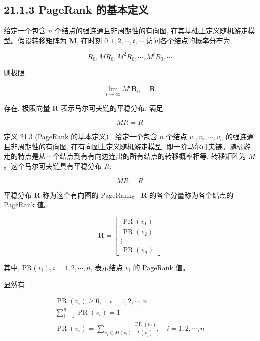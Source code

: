 \documentclass[10pt]{article}
\begin{document}
\begin{CJK*}{UTF8}{bsmi}
\subsection*{21.1.3 PageRank 的基本定义}
给定一个包含 $n$ 个结点的强连通且非周期性的有向图, 在其基础上定义随机游走模型。假设转移矩阵为 $\boldsymbol{M}$, 在时刻 $0,1,2, \cdots, t, \cdots$ 访问各个结点的概率分布为

$$
R_{0}, M R_{0}, M^{2} R_{0}, \cdots, M^{t} R_{0}, \cdots
$$

则极限


\begin{equation*}
\lim _{t \rightarrow \infty} M^{t} \boldsymbol{R}_{0}=\boldsymbol{R} \tag{21.5}
\end{equation*}


存在, 极限向量 $\boldsymbol{R}$ 表示马尔可夫链的平稳分布, 满足

$$
M R=R
$$

定义 21.3 (PageRank 的基本定义） 给定一个包含 $n$ 个结点 $v_{1}, v_{2}, \cdots, v_{n}$ 的强连通且非周期性的有向图, 在有向图上定义随机游走模型, 即一阶马尔可夫链。随机游走的特点是从一个结点到有有向边连出的所有结点的转移概率相等, 转移矩阵为 $M$ 。这个马尔可夫链具有平稳分布 $R:$


\begin{equation*}
M R=R \tag{21.6}
\end{equation*}


平稳分布 $\boldsymbol{R}$ 称为这个有向图的 PageRank。 $\boldsymbol{R}$ 的各个分量称为各个结点的 PageRank 值。

$$
\boldsymbol{R}=\left[\begin{array}{c}
\operatorname{PR}\left(v_{1}\right) \\
\operatorname{PR}\left(v_{2}\right) \\
\vdots \\
\operatorname{PR}\left(v_{n}\right)
\end{array}\right]
$$

其中, $\mathrm{PR}\left(v_{i}\right), i=1,2, \cdots, n$, 表示结点 $v_{i}$ 的 PageRank 值。

显然有


\begin{gather*}
\operatorname{PR}\left(v_{i}\right) \geqslant 0, \quad i=1,2, \cdots, n  \tag{21.7}\\
\sum_{i=1}^{n} \operatorname{PR}\left(v_{i}\right)=1  \tag{21.8}\\
\operatorname{PR}\left(v_{i}\right)=\sum_{v_{j} \in M\left(v_{i}\right)} \frac{\operatorname{PR}\left(v_{j}\right)}{L\left(v_{j}\right)}, \quad i=1,2, \cdots, n \tag{21.9}
\end{gather*}



\end{CJK*}
\end{document}
